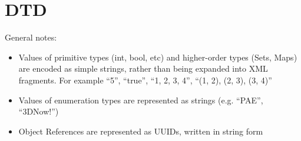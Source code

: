 \newpage
\section{DTD}
General notes:
\begin{itemize}
\item Values of primitive types (int, bool, etc) and higher-order types (Sets, Maps) are encoded as simple strings, rather than being expanded into XML fragments. For example ``5'', ``true'', ``1, 2, 3, 4'', ``(1, 2), (2, 3), (3, 4)''
\item Values of enumeration types are represented as strings (e.g. ``PAE'', ``3DNow!'')
\item Object References are represented as UUIDs, written in string form
\end{itemize}

